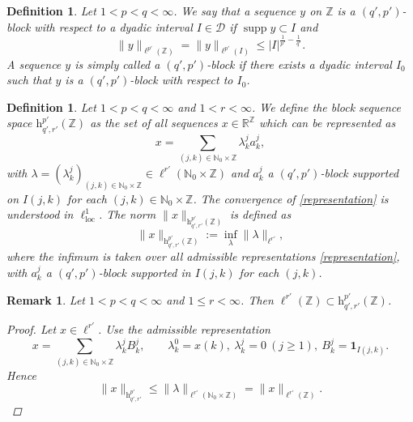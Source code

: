 \documentclass[preprint,12pt]{elsarticle}
\newtheorem{definition}[theorem]{Definition}
\newtheorem{remark}[theorem]{Remark}
\begin{document}
  \begin{definition} 
Let $1<p< q< \infty$. We say that a sequence $y$ on $\mathbb{Z}$ is a \emph{$(q',p')$-block} with respect to a dyadic interval $I\in \mathcal{D}$ if $\operatorname{supp}y\subset I$ and 
\begin{equation*} 
\|y\|_{\ell^{p'}(\mathbb{Z})}= \|y\|_{\ell^{p'}(I)} \leq |I|^{\frac{1}{p'}-\frac{1}{q'}}. 
\end{equation*}
A sequence $y$ is simply called a $(q',p')$-block if there exists a dyadic interval $I_{0}$ such that $y$ is a $(q',p')$-block with respect to $I_{0}$. 
\end{definition} 

\begin{definition} 
Let $1< p< q<\infty $ and $1<r< \infty$. We define the block sequence space $\mathrm{h}_{q',r'}^{p'}(\mathbb{Z})$ as the set of all sequences $x\in \mathbb{R}^{\mathbb{Z}}$ which can be represented as 
\begin{equation}\label{representation} 
x=\sum_{(j,k)\in \mathbb{N}_{0}\times\mathbb{Z}} \lambda_{k}^{j}a_{k}^{j}, 
\end{equation} 
with $\lambda=(\lambda_{k}^{j})_{(j,k)\in \mathbb{N}_{0}\times\mathbb{Z}} \in \ell^{r'}(\mathbb{N}_{0}\times\mathbb{Z})$ and $a_{k}^{j}$ a $(q',p')$-block supported on $I(j,k)$ for each $(j,k)\in \mathbb{N}_{0}\times\mathbb{Z}$. The convergence of \eqref{representation} is understood in $\ell^{1}_{\mathrm{loc}}$. The norm $\|x\|_{\mathrm{h}_{q',r'}^{p'}(\mathbb{Z})}$ is defined as 
\begin{equation}
\|x\|_{\mathrm{h}_{q',r'}^{p'}(\mathbb{Z})} := \inf_{\lambda}\|\lambda\|_{\ell^{r'}}, 
\end{equation} 
where the infimum is taken over all admissible representations \eqref{representation}, with $a_{k}^{j}$ a $(q',p')$-block supported in $I(j,k)$ for each $(j,k)$. 
\end{definition} 
\begin{remark}
Let $1< p<q<\infty$ and $1\le r<\infty$. Then $\ell^{r'}(\mathbb Z)\subset \mathrm{h}^{p'}_{q',r'}(\mathbb Z)$.
\begin{proof}
Let $x\in\ell^{r'}$. Use the admissible representation
\[
x=\sum_{(j,k)\in\mathbb N_0\times\mathbb Z}\lambda_k^j B_k^j,
\qquad 
\lambda_k^0=x(k),\ \lambda_k^j=0\ (j\ge1),\ B_k^j=\mathbf 1_{I(j,k)}.
\]
Hence
\[
\|x\|_{\mathrm{h}^{p'}_{q',r'}}\le \|\lambda\|_{\ell^{r'}(\mathbb N_0\times\mathbb Z)}=\|x\|_{\ell^{r'}(\mathbb Z)}.
\]
\end{proof}
\end{remark}
\end{document}
